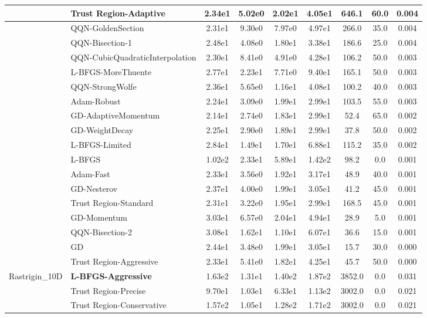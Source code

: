 \documentclass{article}
\begin{document}
\begin{longtable}{|l|l|c|c|c|c|c|c|c|}
\hline
 & Trust Region-Adaptive & 2.34e1 & 5.02e0 & 2.02e1 & 4.05e1 & 646.1 & 60.0 & 0.004 \\
\hline
 & QQN-GoldenSection & 2.31e1 & 9.30e0 & 7.97e0 & 4.97e1 & 266.0 & 35.0 & 0.004 \\
\hline
 & QQN-Bisection-1 & 2.48e1 & 4.08e0 & 1.80e1 & 3.38e1 & 186.6 & 25.0 & 0.004 \\
\hline
 & QQN-CubicQuadraticInterpolation & 2.30e1 & 8.41e0 & 4.91e0 & 4.28e1 & 106.2 & 50.0 & 0.003 \\
\hline
 & L-BFGS-MoreThuente & 2.77e1 & 2.23e1 & 7.71e0 & 9.40e1 & 165.1 & 50.0 & 0.003 \\
\hline
 & QQN-StrongWolfe & 2.36e1 & 5.65e0 & 1.16e1 & 4.08e1 & 100.2 & 40.0 & 0.003 \\
\hline
 & Adam-Robust & 2.24e1 & 3.09e0 & 1.99e1 & 2.99e1 & 103.5 & 55.0 & 0.003 \\
\hline
 & GD-AdaptiveMomentum & 2.14e1 & 2.74e0 & 1.83e1 & 2.99e1 & 52.4 & 65.0 & 0.002 \\
\hline
 & GD-WeightDecay & 2.25e1 & 2.90e0 & 1.89e1 & 2.99e1 & 37.8 & 50.0 & 0.002 \\
\hline
 & L-BFGS-Limited & 2.84e1 & 1.49e1 & 1.70e1 & 6.88e1 & 115.2 & 35.0 & 0.002 \\
\hline
 & L-BFGS & 1.02e2 & 2.33e1 & 5.89e1 & 1.42e2 & 98.2 & 0.0 & 0.001 \\
\hline
 & Adam-Fast & 2.33e1 & 3.56e0 & 1.92e1 & 3.17e1 & 48.9 & 40.0 & 0.001 \\
\hline
 & GD-Nesterov & 2.37e1 & 4.00e0 & 1.99e1 & 3.05e1 & 41.2 & 45.0 & 0.001 \\
\hline
 & Trust Region-Standard & 2.31e1 & 3.22e0 & 1.95e1 & 2.99e1 & 168.5 & 45.0 & 0.001 \\
\hline
 & GD-Momentum & 3.03e1 & 6.57e0 & 2.04e1 & 4.94e1 & 28.9 & 5.0 & 0.001 \\
\hline
 & QQN-Bisection-2 & 3.08e1 & 1.62e1 & 1.10e1 & 6.07e1 & 36.6 & 15.0 & 0.001 \\
\hline
 & GD & 2.44e1 & 3.48e0 & 1.99e1 & 3.05e1 & 15.7 & 30.0 & 0.000 \\
\hline
 & Trust Region-Aggressive & 2.33e1 & 5.41e0 & 1.82e1 & 4.25e1 & 45.7 & 50.0 & 0.000 \\
Rastrigin\_10D & \textbf{L-BFGS-Aggressive} & 1.63e2 & 1.31e1 & 1.40e2 & 1.87e2 & 3852.0 & 0.0 & 0.031 \\
\hline
 & Trust Region-Precise & 9.70e1 & 1.03e1 & 6.33e1 & 1.13e2 & 3002.0 & 0.0 & 0.021 \\
\hline
 & Trust Region-Conservative & 1.57e2 & 1.05e1 & 1.28e2 & 1.71e2 & 3002.0 & 0.0 & 0.021 \\

\end{longtable}
\end{document}
